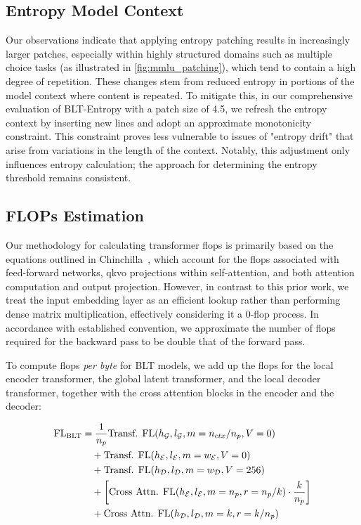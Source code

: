 \subsection{Entropy Model Context}
\label{section:entropy-context}
Our observations indicate that applying entropy patching results in increasingly larger patches, especially within highly structured domains such as multiple choice tasks (as illustrated in \autoref{fig:mmlu_patching}), which tend to contain a high degree of repetition. These changes stem from reduced entropy in portions of the model context where content is repeated. To mitigate this, in our comprehensive evaluation of {\textsc BLT}-Entropy with a patch size of 4.5, we refresh the entropy context by inserting new lines and adopt an approximate monotonicity constraint. This constraint proves less vulnerable to issues of "entropy drift" that arise from variations in the length of the context. Notably, this adjustment only influences entropy calculation; the approach for determining the entropy threshold remains consistent.

\subsection{FLOPs Estimation} 
\label{section:flops}

Our methodology for calculating transformer flops is primarily based on the equations outlined in Chinchilla~\citep{hoffmann2022training}, which account for the flops associated with feed-forward networks, qkvo projections within self-attention, and both attention computation and output projection. However, in contrast to this prior work, we treat the input embedding layer as an efficient lookup rather than performing dense matrix multiplication, effectively considering it a 0-flop process. In accordance with established convention, we approximate the number of flops required for the backward pass to be double that of the forward pass.

To compute flops \textit{per byte} for {\textsc BLT} models, we add up the flops for the local encoder transformer, the global latent transformer, and the local decoder transformer, together with the cross attention blocks in the encoder and the decoder:

\begin{align}
    \text{FL}_{\text{{\textsc BLT}}} &= \frac{1}{n_p} \text{Transf. FL}(h_{\mathcal{G}}, l_{\mathcal{G}}, m=n_{ctx}/n_p, V=0) \\
   &\quad + \text{Transf. FL}(h_{\mathcal{E}}, l_{\mathcal{E}}, m=w_{\mathcal{E}}, V=0) \\
   &\quad + \text{Transf. FL}(h_{\mathcal{D}}, l_{\mathcal{D}}, m=w_{\mathcal{D}}, V=256) \\ 
    &\quad + \left[ \text{Cross Attn. FL}(h_{\mathcal{E}}, l_{\mathcal{E}}, m=n_p, r=n_p/k) \cdot \frac{k}{n_p} \right] \\
   &\quad + \text{Cross Attn. FL}(h_{\mathcal{D}}, l_{\mathcal{D}}, m=k, r=k/n_p) 
\end{align}

